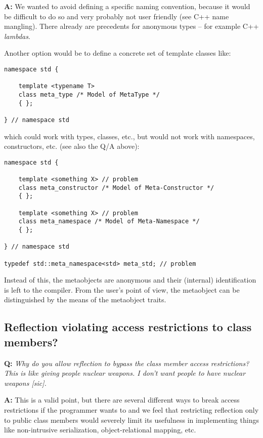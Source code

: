 \textbf{A:} We wanted to avoid defining a specific naming convention, because it would
be difficult to do so and very probably not user friendly (see C++ name mangling). There
already are precedents for anonymous types -- for example C++ {\em lambdas}.

Another option would be to define a concrete set of template classes like:

\begin{verbatim}
namespace std {

	template <typename T>
	class meta_type /* Model of MetaType */
	{ };

} // namespace std
\end{verbatim}

which could work with types, classes, etc., but would not work with namespaces,
constructors, etc. (see also the Q/A above):

\begin{verbatim}
namespace std {

	template <something X> // problem
	class meta_constructor /* Model of Meta-Constructor */
	{ };

	template <something X> // problem
	class meta_namespace /* Model of Meta-Namespace */
	{ };

} // namespace std

typedef std::meta_namespace<std> meta_std; // problem
\end{verbatim}

Instead of this, the metaobjects are anonymous and their (internal) identification
is left to the compiler. From the user's point of view, the metaobject can be distinguished
by the means of the metaobject traits.

\subsection{Reflection violating access restrictions to class members?}

\textbf{Q:} {\em Why do you allow reflection to bypass the class member access
restrictions? This is like giving people nuclear weapons. I don't want people
to have nuclear weapons [sic].}

\textbf{A:}
This is a valid point, but there are several different ways to break access restrictions
if the programmer wants to and we feel that restricting reflection only to public
class members would severely limit its usefulness in implementing things like
non-intrusive serialization, object-relational mapping, etc.

